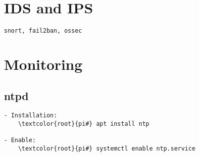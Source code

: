 \documentclass[10pt, a4paper, onecolumn, openany]{book} %
\begin{document}
\section{IDS and IPS}
\begin{Verbatim}[commandchars=\\\{\}]
snort, fail2ban, ossec
\end{Verbatim}

\section{Monitoring}
\subsection{ntpd}
\begin{Verbatim}[commandchars=\\\{\}]
- Installation:
    \textcolor{root}{pi#} apt install ntp

- Enable:
    \textcolor{root}{pi#} systemctl enable ntp.service
\end{Verbatim}
\end{document}
